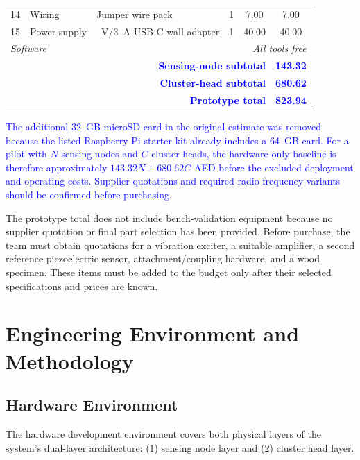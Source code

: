 \documentclass[12pt,a4paper,oneside]{memoir}
\newcommand{\earlierrevision}[1]{\textcolor{blue}{#1}}
\newcommand{\newrevision}[1]{\textcolor{green!45!black}{#1}}
\begin{document}
\begin{table}[H]
{\begin{tabular}{cl>{\raggedright\arraybackslash}p{5.2cm}ccc}
		14 & Wiring              & Jumper wire pack                                   & 1 & 7.00   & 7.00   \\
		15 & Power supply        & 5~V/3~A USB-C wall adapter                         & 1 & 40.00  & 40.00  \\
        \midrule
        \multicolumn{4}{l}{\textit{Software}} & \multicolumn{2}{r}{\textit{All tools free}} \\
        \midrule
		\multicolumn{5}{r}{\earlierrevision{\textbf{Sensing-node subtotal}}} & \earlierrevision{\textbf{143.32}} \\
		\multicolumn{5}{r}{\earlierrevision{\textbf{Cluster-head subtotal}}} & \earlierrevision{\textbf{680.62}} \\
		\multicolumn{5}{r}{\earlierrevision{\textbf{Prototype total}}} & \earlierrevision{\textbf{823.94}} \\
        \bottomrule
    \end{tabular}
    }
\end{table}

\earlierrevision{The additional 32~GB microSD card in the original estimate was removed because the listed Raspberry Pi starter kit already includes a 64~GB card. For a pilot with $N$ sensing nodes and $C$ cluster heads, the hardware-only baseline is therefore approximately $143.32N + 680.62C$ AED before the excluded deployment and operating costs. Supplier quotations and required radio-frequency variants should be confirmed before purchasing.}

\newrevision{The prototype total does not include bench-validation equipment because no supplier quotation or final part selection has been provided. Before purchase, the team must obtain quotations for a vibration exciter, a suitable amplifier, a second reference piezoelectric sensor, attachment/coupling hardware, and a wood specimen. These items must be added to the budget only after their selected specifications and prices are known.}

\section{Engineering Environment and Methodology}
\label{ch:engineering_env}

\subsection{Hardware Environment}
\label{sec:hw_environment}

The hardware development environment covers both physical layers of the system’s dual-layer architecture: (1) sensing node layer and (2) cluster head layer.
\end{document}
